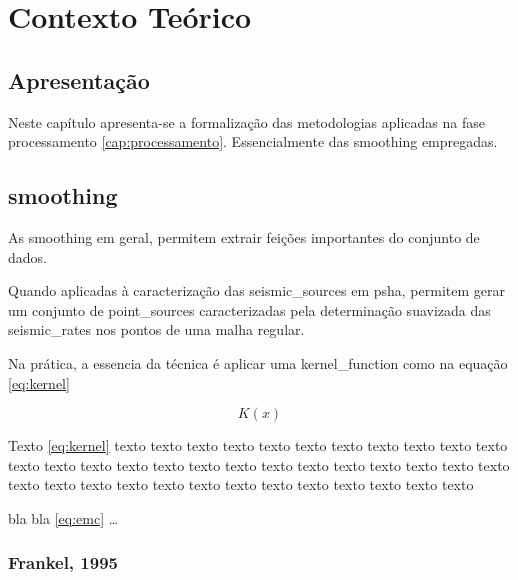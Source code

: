 \chapter{Contexto Teórico}
\label{cap:teoria}


\section{Apresentação}
\label{sec:c04_apresentacao}


Neste capítulo apresenta-se a formalização das metodologias aplicadas na fase 
processamento \ref{cap:processamento}. Essencialmente das \gls{smoothing} empregadas.

\section{\Gls{smoothing}}
\label{sec:04_smoothing_general}

As \gls{smoothing} em geral, permitem extrair feições importantes do conjunto de dados.

Quando aplicadas à caracterização das \glspl{seismic_source} em \gls{psha},
permitem gerar um conjunto de \glspl{point_source} 
caracterizadas pela determinação suavizada das \glspl{seismic_rate} 
nos pontos de uma malha regular. 

Na prática, a essencia da técnica é aplicar uma \gls{kernel_function} como na equação \ref{eq:kernel}

\begin{equation}
K(x)
\label{eq:kernel}
\end{equation}


Texto \ref{eq:kernel} texto texto texto texto texto texto texto texto texto
texto texto texto texto texto texto texto texto texto texto texto texto texto texto texto texto
texto texto texto texto texto texto texto texto texto texto texto texto texto

bla bla \eqref{eq:emc} \ldots


\subsection{Frankel, 1995}
\label{sec:acidos_nucleicos}

